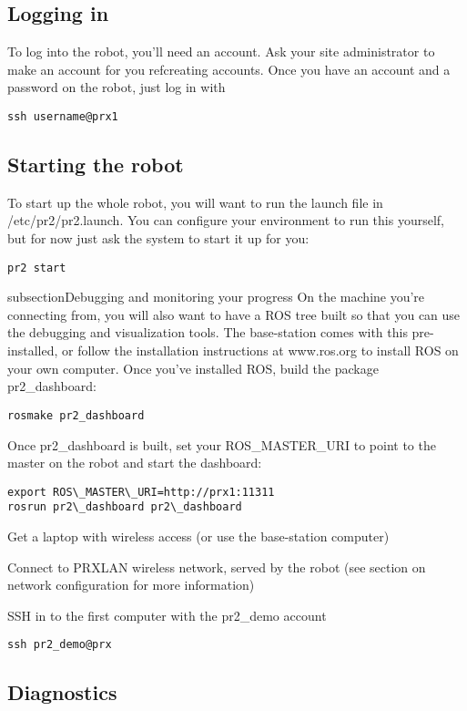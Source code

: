 \subsection{Logging in}
To log into the robot, you'll need an account.  Ask your site administrator to make an account for you ref{creating accounts}.  Once you have an account and a password on the robot, just log in with
\begin{verbatim}
ssh username@prx1
\end{verbatim}

\subsection{Starting the robot}
To start up the whole robot, you will want to run the launch file in /etc/pr2/pr2.launch.  You can configure your environment to run this yourself, but for now just ask the system to start it up for you:
\begin{verbatim}
pr2 start
\end{verbatim}

subsection{Debugging and monitoring your progress}
On the machine you're connecting from, you will also want to have a ROS tree built so that you can use the debugging and visualization tools.  The base-station comes with this pre-installed, or follow the installation instructions at www.ros.org to install ROS on your own computer.
Once you've installed ROS, build the package pr2\_dashboard:
\begin{verbatim}
rosmake pr2_dashboard
\end{verbatim}

Once pr2\_dashboard is built, set your ROS\_MASTER\_URI to point to the master on the robot and start the dashboard:
\begin{verbatim}
export ROS\_MASTER\_URI=http://prx1:11311
rosrun pr2\_dashboard pr2\_dashboard
\end{verbatim}



Get a laptop with wireless access (or use the base-station computer)

Connect to PRXLAN wireless network, served by the robot (see section on network configuration for more information)

SSH in to the first computer with the pr2\_demo account
\begin{verbatim}
ssh pr2_demo@prx
\end{verbatim}


\subsection{Diagnostics}
